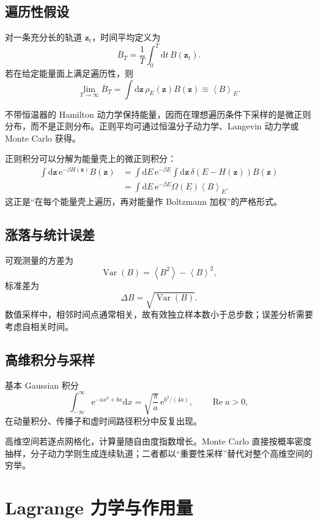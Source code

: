 \documentclass[11pt,a4paper,oneside,openany,fontset=fandol]{ctexbook}
\newcommand{\dd}{\mathrm{d}}
\newcommand{\ee}{\mathrm{e}}
\newcommand{\Var}{\operatorname{Var}}
\newcommand{\avg}[1]{\left\langle #1\right\rangle}
\newcommand{\vct}[1]{\bm{#1}}
\begin{document}
\section{遍历性假设}

对一条充分长的轨道 $\vct z_t$，时间平均定义为
\[
\overline B_T
=
\frac1T\int_0^T\dd t\,B(\vct z_t).
\]
若在给定能量面上满足遍历性，则
\[
\lim_{T\to\infty}\overline B_T
=
\int\dd\vct z\,\rho_E(\vct z)B(\vct z)
\equiv\avg{B}_E.
\]

\begin{remarkbox}[一个容易混淆的点]
不带恒温器的 Hamilton 动力学保持能量，因而在理想遍历条件下采样的是微正则分布，而不是正则分布。正则平均可通过恒温分子动力学、Langevin 动力学或 Monte Carlo 获得。
\end{remarkbox}

正则积分可以分解为能量壳上的微正则积分：
\begin{align}
\int\dd\vct z\,\ee^{-\beta H(\vct z)}B(\vct z)
&=
\int\dd E\,\ee^{-\beta E}
\int\dd\vct z\,
\delta(E-H(\vct z))B(\vct z)\\
&=
\int\dd E\,\ee^{-\beta E}\Omega(E)\avg{B}_E.
\end{align}
这正是“在每个能量壳上遍历，再对能量作 Boltzmann 加权”的严格形式。

\section{涨落与统计误差}

可观测量的方差为
\[
\Var(B)
=
\avg{B^2}-\avg{B}^2,
\]
标准差为
\[
\Delta B=\sqrt{\Var(B)}.
\]
数值采样中，相邻时间点通常相关，故有效独立样本数小于总步数；误差分析需要考虑自相关时间。

\section{高维积分与采样}

基本 Gaussian 积分
\[
\int_{-\infty}^{\infty}\ee^{-a x^2+b x}\dd x
=
\sqrt{\frac{\pi}{a}}\,
\ee^{b^2/(4a)},
\qquad \operatorname{Re}a>0,
\]
在动量积分、传播子和虚时间路径积分中反复出现。

高维空间若逐点网格化，计算量随自由度指数增长。Monte Carlo 直接按概率密度抽样，分子动力学则生成连续轨道；二者都以“重要性采样”替代对整个高维空间的穷举。

\chapter{Lagrange 力学与作用量}
\end{document}

